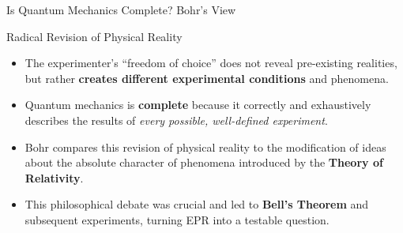 \begin{frame}{Is Quantum Mechanics Complete? Bohr's View}

  \begin{block}{Radical Revision of Physical Reality}
    \begin{itemize}[<+->]
      \item The experimenter's ``freedom of choice'' does not reveal pre-existing realities, but rather \textbf{creates different experimental conditions} and phenomena.
      \item Quantum mechanics is \textbf{complete} because it correctly and exhaustively describes the results of \emph{every possible, well-defined experiment}.
      \item Bohr compares this revision of physical reality to the modification of ideas about the absolute character of phenomena introduced by the \textbf{Theory of Relativity}.
      \item This philosophical debate was crucial and led to \textbf{Bell's Theorem} and subsequent experiments, turning EPR into a testable question.
    \end{itemize}
  \end{block}

\end{frame}

